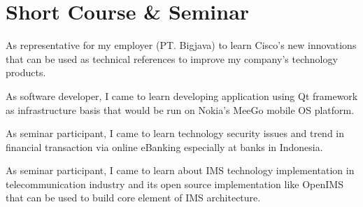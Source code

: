 \documentclass[10pt, a4paper]{moderncv}
\begin{document}
\section{Short Course \& Seminar}
{
    \begin{scriptsize}
        As representative for my employer (PT. Bigjava) to learn Cisco's new innovations that can be used as technical references to improve my
        company's technology products.
    \end{scriptsize}
}
{
    \begin{scriptsize}
        As software developer, I came to learn developing application using Qt framework as infrastructure basis that would be run on Nokia's MeeGo
        mobile OS platform.
    \end{scriptsize}
}
{
    \begin{scriptsize}
        As seminar participant, I came to learn technology security issues and trend in financial transaction via online eBanking especially at
        banks in Indonesia.
    \end{scriptsize}
}
{
    \begin{scriptsize}
        As seminar participant, I came to learn about IMS technology implementation in telecommunication industry and its open source implementation
        like OpenIMS that can be used to build core element of IMS architecture.
    \end{scriptsize}
}
\end{document}
